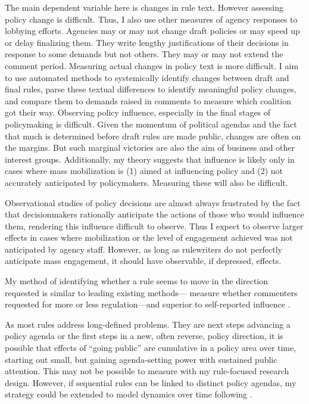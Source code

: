 The main dependent variable here is changes in rule text. However assessing policy change is difficult. Thus, I also use other measures of agency responses to lobbying efforts. 
Agencies may or may not change draft policies or may speed up or delay finalizing them. They write lengthy justifications of their decisions in response to some demands but not others. They may or may not extend the comment period. Measuring actual changes in policy text is more difficult. I aim to use automated methods to systemically identify changes between draft and final rules, parse these textual differences to identify meaningful policy changes, and compare them to demands raised in comments to measure which coalition got their way.
Observing policy influence, especially in the final stages of policymaking is difficult. Given the momentum of political agendas and the fact that much is determined before draft rules are made public, changes are often on the margins. But such marginal victories are also the aim of business and other interest groups. 
Additionally, my theory suggests that influence is likely only in cases where mass mobilization is (1) aimed at influencing policy and (2) not accurately anticipated by policymakers. Measuring these will also be difficult.



Observational studies of policy decisions are almost always frustrated by the fact that decisionmakers rationally anticipate the actions of those who would influence them, rendering this influence difficult to observe. Thus I expect to observe larger effects in cases where mobilization or the level of engagement achieved was not anticipated by agency staff. However, as long as rulewriters do not perfectly anticipate mass engagement, it should have observable, if depressed, effects. 

My method of identifying whether a rule seems to move in the direction requested is similar to leading existing methods---\citet{Yackee2006JOP} measure whether commenters requested for more or less regulation---and superior to self-reported influence \citep{Furlong1997}.

As most rules address long-defined problems. They are next steps advancing a policy agenda \citep{West2013} or the first steps in a new, often reverse, policy direction, it is possible that effects of ``going public'' are cumulative in a policy area over time, starting out small, but gaining agenda-setting power with sustained public attention. This may not be possible to measure with my rule-focused research design. However, if sequential rules can be linked to distinct policy agendas, my strategy could be extended to model dynamics over time following \citet{Brookhart2015}.



